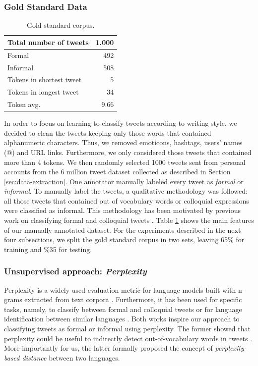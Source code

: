 \documentclass[information,article,submit,moreauthors,pdftex,10pt,a4paper]{Definitions/mdpi}
\begin{document}
\subsubsection{Gold Standard Data}\label{sec:gold-standard-data}

\begin{table}[H]
  \centering
  \begin{tabular}{|l|r|} \hline
    Total number of tweets & 1.000 \\ \hline
    Formal & 492 \\ \hline
    Informal & 508 \\ \hline
    Tokens in shortest tweet & 5 \\ \hline
    Tokens in longest tweet & 34 \\ \hline
    Token avg. & 9.66 \\ \hline
  \end{tabular}
  \caption{Gold standard corpus.}
  \label{tab:gold-corpus}
\end{table}

In order to focus on learning to classify tweets according to writing style, we decided to clean the tweets keeping only those words that contained alphanumeric characters. Thus, we removed emoticons, hashtags, users' names (@) and URL links. Furthermore, we only considered those tweets that contained more than 4 tokens. We then randomly selected 1000 tweets sent from personal accounts from the 6 million tweet dataset collected as described in Section \ref{sec:data-extraction}. One annotator manually labeled every tweet as \emph{formal} or \emph{informal}. To manually label the tweets, a qualitative methodology was followed: all those tweets that contained out of vocabulary words or colloquial expressions were classified as informal. This methodology has been motivated by previous work on classifying formal and colloquial tweets \cite{gonzalez2015analysis}. Table \ref{tab:gold-corpus} shows the main features of our manually annotated dataset. For the experiments described in the next four subsections, we split the gold standard corpus in two sets, leaving 65\% for training and \%35 for testing.

\subsubsection{Unsupervised approach: \textit{Perplexity}}\label{sec:unsup-appr-text}

Perplexity is a widely-used evaluation metric for language models built with n-grams extracted from text corpora \cite{chen1999empirical}. Furthermore, it has been used for specific tasks, namely, to classify between formal and colloquial tweets \cite{gonzalez2015analysis} or for language identification between similar languages \cite{gamallo2017language}. Both works inspire our approach to classifying tweets as formal or informal using perplexity. The former showed that perplexity could be useful to indirectly detect out-of-vocabulary words in tweets \cite{gonzalez2015analysis}. More importantly for us, the latter formally proposed the concept of \emph{perplexity-based distance} between two languages.
\end{document}
